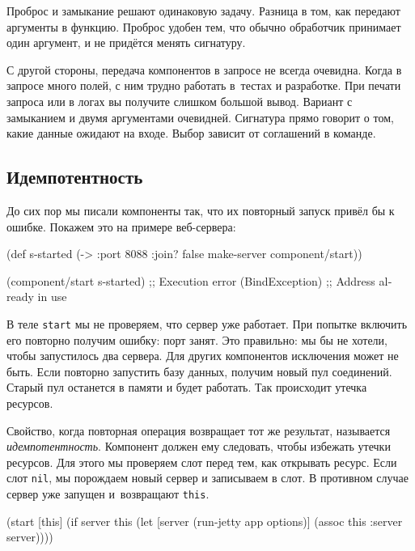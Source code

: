 Проброс и замыкание решают одинаковую задачу. Разница в том, как передают
аргументы в функцию. Проброс удобен тем, что обычно обработчик принимает один
аргумент, и не придётся менять сигнатуру.

С другой стороны, передача компонентов в запросе не всегда очевидна. Когда в
запросе много полей, с ним трудно работать в~тестах и разработке. При печати
запроса или в логах вы получите слишком большой вывод. Вариант с замыканием и
двумя аргументами очевидней. Сигнатура прямо говорит о том, какие данные ожидают
на входе. Выбор зависит от соглашений в команде.

\subsection{Идемпотентность}

До сих пор мы писали компоненты так, что их повторный запуск привёл бы к
ошибке. Покажем это на примере веб-сервера:

\begin{english}
  \begin{clojure}
(def s-started (-> {:port 8088 :join? false}
                    make-server
                    component/start))

(component/start s-started)
;; Execution error (BindException)
;; Address already in use
  \end{clojure}
\end{english}

В теле \verb|start| мы не проверяем, что сервер уже работает. При попытке
включить его повторно получим ошибку: порт занят. Это правильно: мы бы не
хотели, чтобы запустилось два сервера. Для других компонентов исключения может
не быть. Если повторно запустить базу данных, получим новый пул
соединений. Старый пул останется в памяти и будет работать. Так происходит
утечка ресурсов.


Свойство, когда повторная операция возвращает тот же результат, называется
\emph{идемпотентность}. Компонент должен ему следовать, чтобы избежать утечки
ресурсов. Для этого мы проверяем слот перед тем, как открывать ресурс. Если слот
\verb|nil|, мы порождаем новый сервер и записываем в слот. В противном случае
сервер уже запущен и~возвращают \verb|this|.

\begin{english}
  \begin{clojure}
(start [this]
  (if server
    this
    (let [server (run-jetty app options)]
      (assoc this :server server))))
  \end{clojure}
\end{english}

